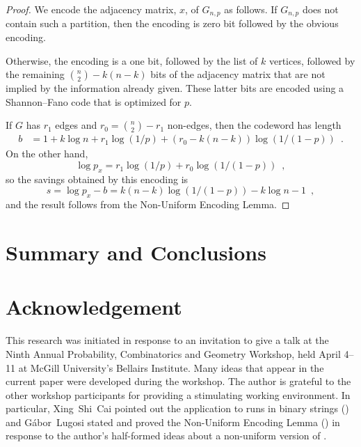 \documentclass{patmorin}
\begin{document}
\begin{proof}
  We encode the adjacency matrix, $x$, of $G_{n,p}$ as follows.
  If $G_{n,p}$ does not contain such a partition, then the encoding is
  zero bit followed by the obvious encoding.

  Otherwise, the encoding is a one bit, followed by the list of $k$
  vertices, followed by the remaining $\binom{n}{2}-k(n-k)$ bits of the
  adjacency matrix that are not implied by the information already given.
  These latter bits are encoded using a Shannon--Fano code that is
  optimized for $p$.

  If $G$ has $r_1$ edges and $r_0=\binom{n}{2}-r_1$ non-edges, then the codeword has length
  \begin{align*}
      b & = 1 + k\log n + r_1\log(1/p) + (r_0-k(n-k))\log(1/(1-p)) \enspace .
  \end{align*}
  On the other hand,
  \[
      \log p_x = r_1\log(1/p) + r_0\log(1/(1-p)) \enspace ,
  \]
  so the savings obtained by this encoding is 
  \[
      s = \log p_x - b = k(n-k)\log(1/(1-p)) - k\log n - 1 \enspace ,
  \]
  and the result follows from the Non-Uniform Encoding Lemma.
\end{proof}




\subsection{}




\section{Summary and Conclusions}


\section*{Acknowledgement}

This research was initiated in response to an invitation to give
a talk at the Ninth Annual Probability, Combinatorics and Geometry
Workshop, held April 4--11 at McGill University's Bellairs Institute.
Many ideas that appear in the current paper were developed during the
workshop. The author is grateful to the other workshop participants for
providing a stimulating working environment.  In particular, Xing~Shi~Cai
pointed out the application to runs in binary strings ()
and G\'abor~Lugosi stated and proved the Non-Uniform Encoding Lemma
() in response to the author's half-formed ideas about a
non-uniform version of .



\end{document}
